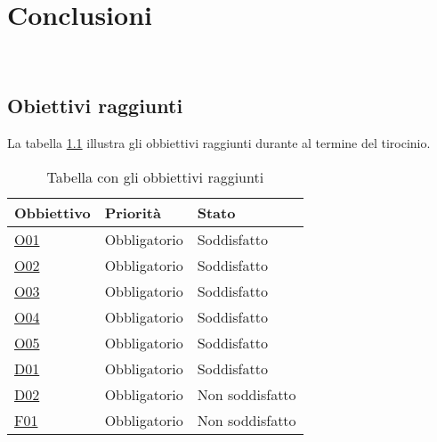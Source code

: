 \chapter{Conclusioni}
\label{cap:conclusioni}

\\

\section{Obiettivi raggiunti}
\label{sec:raggiungimento-obiettivi}

La tabella \ref{tab:obbiettivi-raggiunti} illustra gli obbiettivi raggiunti durante al termine del tirocinio.

\begin{table}
    \centering
    \begin{tabular}{|l|l|l|}
        \hline
        \textbf{Obbiettivo} & \textbf{Priorità} & \textbf{Stato} \\ \hline
        \hyperref[O01]{O01}                & Obbligatorio      & Soddisfatto    \\ \hline
        \hyperref[O02]{O02}                & Obbligatorio      & Soddisfatto    \\ \hline
        \hyperref[O03]{O03}                & Obbligatorio      & Soddisfatto    \\ \hline
        \hyperref[O04]{O04}                & Obbligatorio      & Soddisfatto    \\ \hline
        \hyperref[O05]{O05}                & Obbligatorio      & Soddisfatto    \\ \hline
        \hyperref[D01]{D01}                & Obbligatorio      & Soddisfatto    \\ \hline
        \hyperref[D02]{D02}                & Obbligatorio      & Non soddisfatto    \\ \hline
        \hyperref[F01]{F01}                & Obbligatorio      & Non soddisfatto    \\ \hline
    \end{tabular}%
\caption{Tabella con gli obbiettivi raggiunti}
\label{tab:obbiettivi-raggiunti}
\end{table}

